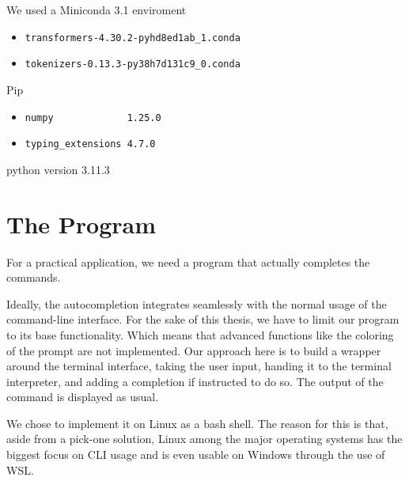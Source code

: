 
We used a Miniconda 3.1 enviroment

\begin{itemize}
\item \begin{verbatim}
transformers-4.30.2-pyhd8ed1ab_1.conda
\end{verbatim}

\item \begin{verbatim}
tokenizers-0.13.3-py38h7d131c9_0.conda
\end{verbatim}
  
\end{itemize}

Pip
\begin{itemize}
\item \begin{verbatim}
numpy             1.25.0
\end{verbatim}

\item \begin{verbatim}
typing_extensions 4.7.0
\end{verbatim}
  
\end{itemize}


python version  3.11.3







\section{The Program}

For a practical application, we need a program that actually completes the commands.

Ideally, the autocompletion integrates seamlessly with the normal usage of the command-line interface. For the sake of this thesis, we have to limit our program to its base functionality. Which means that advanced functions like the coloring of the prompt are not implemented. Our approach here is to build a wrapper around the terminal interface, taking the user input, handing it to the terminal interpreter, and adding a completion if instructed to do so. The output of the command is displayed as usual.



We chose to implement it on Linux as a bash shell. The reason for this is that, aside from a pick-one solution, Linux among the major operating systems has the biggest focus on CLI usage and is even usable on Windows through the use of WSL.


